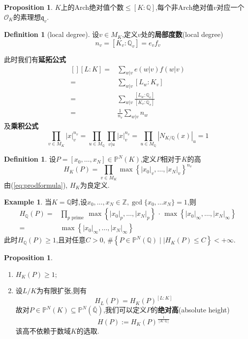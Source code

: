 \documentclass[12pt,A4paper,oneside,reqno]{amsart}
\numberwithin{equation}{section}
\theoremstyle{definition}
\newtheorem{proposition}[theorem]{Proposition}
\newtheorem{defn}[theorem]{Definition}
\newtheorem{example}[theorem]{Example}
\theoremstyle{plain}
\theoremstyle{plain}
\numberwithin{equation}{section}
\theoremstyle{remark}
\begin{document}
\begin{proposition}
	$K$上的Arch绝对值个数$\leqslant [K:\mathbb{Q}]$,每个非Arch绝对值$v$对应一个$\mathcal{O}_K$的素理想$\mathfrak{q}_v$.
\end{proposition}
\begin{defn}[local degree]
	设$v \in M_K$,定义$v$处的\textbf{局部度数}(local degree)
	$$n_v=[K_v:\mathbb{Q}_v]=e_vf_v$$
\end{defn}
此时我们有\textbf{延拓公式}
\begin{equation*}
\begin{aligned}[]
[L:K]=&\sum_{w | v}e(w|v)f(w|v)\\
=&\sum_{w | v}[L_w:K_v]\\
=&\sum_{w | v}\frac{[L_w:\mathbb{Q}_v]}{[K_v:\mathbb{Q}_v]}\\
=&\frac{1}{n_v}\sum_{w | v}n_w
\end{aligned}
\end{equation*}
及\textbf{乘积公式}
\begin{equation}\label{eq:prodformula}
\prod_{v \in M_K}|x|_v^{n_v}=\prod_{u \in M_\mathbb{Q}}\prod_{v|u}|x|_v^{n_v}=\prod_{u \in M_\mathbb{Q}}|N_{K/\mathbb{Q}}(x)|_u=1
\end{equation}
\begin{defn}
	设$P=[x_0, \ldots, x_N] \in \mathbb{P}^N(K)$,定义$P$相对于$K$的高
	$$H_K(P)=\prod_{v \in M_K} \max \left\{|x_0|_v, \ldots , |x_N|_v \right\}^{n_v}$$
	由(\ref{eq:prodformula}), $H_K$为良定义.
\end{defn}
\begin{example}
	当$K=\mathbb{Q}$时,设$x_0,\ldots,x_N \in \mathbb{Z}, \gcd 
\{x_0, \ldots x_N\}=1$,则
\begin{equation*}
\begin{aligned}
H_{\mathbb{Q}}(P)=&\prod_{p \text{ prime }}\max \left\{|x_0|_p, \ldots , |x_N|_p \right\}\,\cdot \,\max\left\{|x_0|_{\infty}, \ldots , |x_N|_{\infty} \right\}\\
=&\max\left\{|x_0|_{\infty}, \ldots , |x_N|_{\infty} \right\}
\end{aligned}
\end{equation*}
此时$H_{\mathbb{Q}}(P) \geqslant 1$,且对任意$C>0$, $\#\left\{P \in \mathbb{P}^N(\mathbb{Q}) \mid| H_K(P)\leqslant C \right\}<+\infty$.
\end{example}
\begin{proposition}\
	\begin{enumerate}[1.]
		\item $H_K(P) \geqslant 1$;
		\item 设$L/K$为有限扩张,则有
		$$H_L(P)=H_K(P)^{[L:K]}$$
		故对$P \in \mathbb{P}^N(K) \subseteq \mathbb{P}^N(\bar{\mathbb{Q}})$,我们可以定义$P$的\textbf{绝对高}(absolute height)
		$$H(P):=H_K(P)^{\frac{1}{[K:\mathbb{Q}]}}$$
		该高不依赖于数域$K$的选取.
	\end{enumerate}
\end{proposition}
\end{document}
